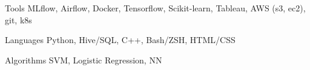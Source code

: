 

\begin{cvskills}

  \cvskill
    {Tools} %
    {MLflow, Airflow, Docker, Tensorflow, Scikit-learn, Tableau, AWS (s3, ec2), git, k8s} %

  \cvskill
    {Languages} %
    {Python, Hive/SQL, C++, Bash/ZSH, HTML/CSS} %

  \cvskill
    {Algorithms} %
    {SVM, Logistic Regression, NN} %


\end{cvskills}
